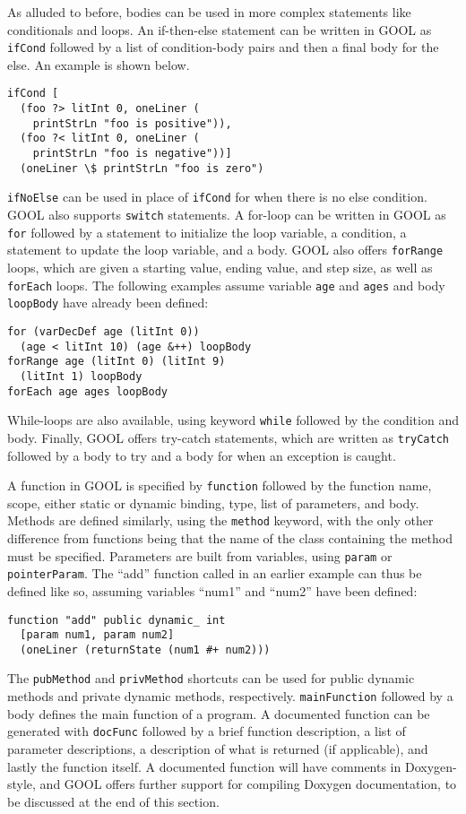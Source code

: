 \documentclass[sigplan,review,anonymous,prologue,dvipsnames]{acmart}
\begin{document}
As alluded to before, bodies can be used in more complex statements like 
conditionals and loops. An if-then-else statement can be written in GOOL as 
\verb|ifCond| followed by a list of condition-body pairs and then a final body 
for the else. An example is shown below.
\begin{lstlisting}
ifCond [
  (foo ?> litInt 0, oneLiner (
    printStrLn "foo is positive")),
  (foo ?< litInt 0, oneLiner (
    printStrLn "foo is negative"))] 
  (oneLiner \$ printStrLn "foo is zero")
\end{lstlisting}
\verb|ifNoElse| can be used in place of \verb|ifCond| for when there is no else 
condition. GOOL also supports \verb|switch| statements. A for-loop can be 
written in GOOL as \verb|for| followed by a statement to 
initialize the loop variable, a condition, a statement to update the loop 
variable, and a body. GOOL also offers \verb|forRange| loops, which are given a 
starting value, ending value, and step size, as well as \verb|forEach| loops. 
The following examples assume variable \verb|age| and \verb|ages| and body 
\verb|loopBody| have already been defined:
\begin{lstlisting}
for (varDecDef age (litInt 0)) 
  (age < litInt 10) (age &++) loopBody
forRange age (litInt 0) (litInt 9) 
  (litInt 1) loopBody
forEach age ages loopBody
\end{lstlisting}
While-loops are also available, using keyword \verb|while| followed by the 
condition and body. Finally, GOOL offers try-catch statements, which are 
written as \verb|tryCatch| followed by a body to try and a body for when an 
exception is caught.

A function in GOOL is specified by \verb|function| followed by the function 
name, scope, either static or dynamic binding, type, list of parameters, and 
body. Methods are defined similarly, using the \verb|method| keyword, with the 
only other difference from functions being that the name of the class 
containing the method must be specified. Parameters are built from variables, 
using \verb|param| or \verb|pointerParam|. The ``add'' function called in 
an earlier example can thus be defined like so, assuming variables ``num1'' and 
``num2'' have been defined:
\begin{lstlisting}
function "add" public dynamic_ int 
  [param num1, param num2] 
  (oneLiner (returnState (num1 #+ num2)))
\end{lstlisting}
The  \verb|pubMethod| and \verb|privMethod| shortcuts can be used for public 
dynamic methods and private dynamic methods, respectively. \verb|mainFunction| 
followed by a body defines the main function of a program. A documented 
function can be generated with \verb|docFunc| followed by a brief function 
description, a list of parameter descriptions, a description of what is 
returned (if applicable), and lastly the function itself. A documented function 
will have comments in Doxygen-style, and GOOL offers further support for 
compiling Doxygen documentation, to be discussed at the end of this section.
\end{document}
